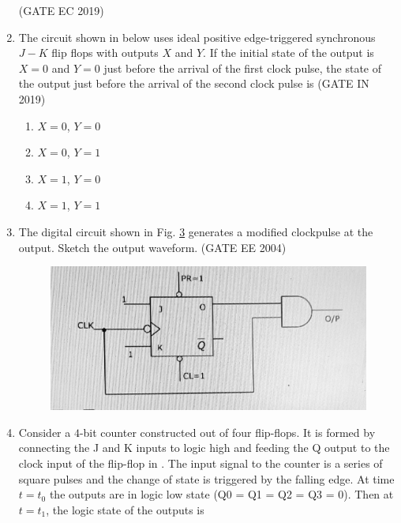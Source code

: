 \begin{enumerate}[label=\arabic*.,ref=\theenumi]
		\hfill(GATE EC 2019)
	\begin{figure}[H]
    \centering
    \resizebox{0.75\columnwidth}{!}{%
			
			}
    \caption{}
	\label{fig:GATE-EC2019,25}
\end{figure}
%
 \item The circuit shown in 
below uses ideal positive edge-triggered synchronous $J-K$ flip flops with outputs $X$ and $Y$. If the initial state of the output is $X=0$ and $Y=0$ just before the arrival of the first clock pulse, the state of the output just before the arrival of the second clock pulse is
              \hfill(GATE IN 2019)
\begin{enumerate}
    \item $X=0$, $Y=0$
    \item $X=0$, $Y=1$
    \item $X=1$, $Y=0$
    \item$X=1$, $Y=1$
\end{enumerate}
	\begin{figure}[H]
    \centering
    \resizebox{0.75\columnwidth}{!}{%
    
	}
    \caption{}
	\label{fig:GATE-IN2019,12}
\end{figure}
%
	\item The digital circuit shown in Fig. \ref{fig:2004-gate-ee-68} generates a modified clockpulse at the output. Sketch the output waveform.
\label{prob:2004-gate-ee-68}
\hfill (GATE EE 2004)
%
\begin{figure}[H]
	\centering
	\includegraphics[width=0.75\columnwidth]{figs/2004-gate-ee-68.jpg}
	\caption{}
\label{fig:2004-gate-ee-68}
\end{figure}
%
\item Consider a $4$-bit counter constructed out of four flip-flops. It is formed by connecting the J and K inputs to logic high and feeding the Q output to the clock input of the flip-flop in 
	.
 The input signal to the counter is a series of square pulses and the change of state is triggered by the falling edge. At time $t=t_0$ the outputs are in logic low state (Q0 = Q1 = Q2 = Q3 = 0). Then at $t=t_1$, the logic state of the outputs is 

\end{enumerate}
